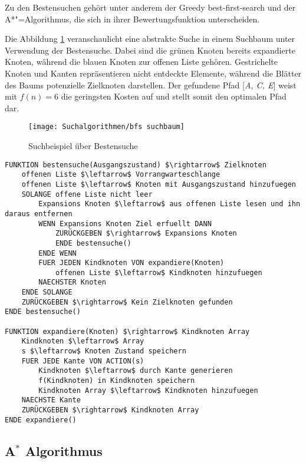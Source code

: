 Zu den Bestensuchen geh\"{o}rt unter anderem der Greedy best-first-search und der A*"=Algorithmus, die sich in ihrer Bewertungsfunktion unterscheiden.

Die Abbildung \ref{fig:bestensuche beispiel} veranschaulicht eine abstrakte Suche in einem Suchbaum unter Verwendung der Bestensuche. Dabei sind die gr\"{u}nen Knoten bereits expandierte Knoten, w\"{a}hrend die blauen Knoten zur offenen Liste geh\"{o}ren. Gestrichelte Knoten und Kanten repr\"{a}sentieren nicht entdeckte Elemente, w\"{a}hrend die Bl\"{a}tter des Baums potenzielle Zielknoten darstellen. Der gefundene Pfad [\textit{A, C, E}] weist mit $f(n) = 6$ die geringsten Kosten auf und stellt somit den optimalen Pfad dar.


\begin{figure}[h]
  \centering
  \texttt{[image: Suchalgorithmen/bfs suchbaum]}
	\captionsetup{justification=justified, format=plain}
  \caption{Suchbeispiel \"{u}ber Bestensuche}
  \label{fig:bestensuche beispiel}
\end{figure}


\begin{lstlisting}[language=Pseudo, caption={Pseudocode: Bestensuche}, mathescape=true, label={lst:pseudo bestensuche}]
FUNKTION bestensuche(Ausgangszustand) $\rightarrow$ Zielknoten
    offenen Liste $\leftarrow$ Vorrangwarteschlange
    offenen Liste $\leftarrow$ Knoten mit Ausgangszustand hinzufuegen
    SOLANGE offene Liste nicht leer
        Expansions Knoten $\leftarrow$ aus offenen Liste lesen und ihn daraus entfernen
        WENN Expansions Knoten Ziel erfuellt DANN
            ZURÜCKGEBEN $\rightarrow$ Expansions Knoten
            ENDE bestensuche()
        ENDE WENN
        FUER JEDEN Kindknoten VON expandiere(Knoten)
            offenen Liste $\leftarrow$ Kindknoten hinzufuegen
        NAECHSTER Knoten
    ENDE SOLANGE
    ZURÜCKGEBEN $\rightarrow$ Kein Zielknoten gefunden
ENDE bestensuche()

FUNKTION expandiere(Knoten) $\rightarrow$ Kindknoten Array
    Kindknoten $\leftarrow$ Array
    s $\leftarrow$ Knoten Zustand speichern
    FUER JEDE Kante VON ACTION(s)
        Kindknoten $\leftarrow$ durch Kante generieren
        f(Kindknoten) in Kindknoten speichern
        Kindknoten Array $\leftarrow$ Kindknoten hinzufuegen
    NAECHSTE Kante
    ZURÜCKGEBEN $\rightarrow$ Kindknoten Array
ENDE expandiere()
\end{lstlisting}

\subsection{A$^*$ Algorithmus}
\label{chap:a stern suchalgorithmus}

